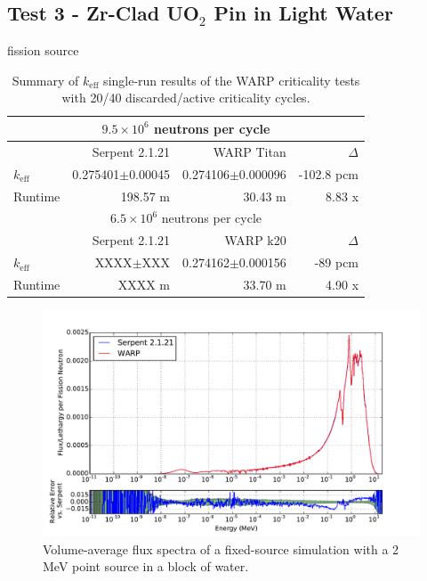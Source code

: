 \documentclass[preprint,12pt]{elsarticle}
\begin{document}
\subsection{Test 3 - Zr-Clad UO$_2$ Pin in Light Water}

fission source

\begin{table}[h]
\centering
\caption{Summary of $k_\mathrm{eff}$ single-run results of the WARP criticality tests with 20/40 discarded/active criticality cycles.}
\label{pincell_table}
\small
\begin{tabular}{| l | r | r | r |}
\hline
\multicolumn{4}{|c|}{$9.5\times10^6$ neutrons per cycle} \\
\hline
                  & Serpent 2.1.21       & WARP Titan               & $\Delta$ \\
\hline
$k_\mathrm{eff}$  & 0.275401$\pm$0.00045 & 0.274106$\pm$0.000096         & -102.8 pcm \\
\hline
Runtime           & 198.57 m            & 30.43 m                  & 8.83 x \\
\hline
\hline
\multicolumn{4}{|c|}{$6.5\times10^6$ neutrons per cycle} \\
\hline
                  & Serpent 2.1.21       & WARP k20            & $\Delta$ \\
\hline
$k_\mathrm{eff}$  & XXXX$\pm$XXX & 0.274162$\pm$0.000156     & -89 pcm \\
\hline
Runtime           & XXXX m             & 33.70 m             & 4.90 x\\
\hline
\end{tabular}
\end{table}


\begin{figure}[h!]
\centering
\includegraphics[width=\textwidth,trim= 1cm 0cm 1cm 0cm]{graphics/pincell_spec.pdf}
\caption{Volume-average flux spectra of a fixed-source simulation with a 2 MeV point source in a block of water. \label{pincell_spec} }
\end{figure}
\end{document}
